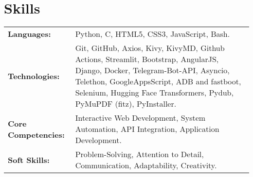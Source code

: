\documentclass[a4paper,10pt]{article}
\begin{document}
\section{Skills}
\begin{tabularx}{\linewidth}{@{} l X @{}}
    \textbf{Languages:} & Python, C, HTML5, CSS3, JavaScript, Bash. \\
    \textbf{Technologies:} & Git, GitHub, Axios, Kivy, KivyMD, Github Actions, Streamlit, Bootstrap, AngularJS, Django, Docker, Telegram-Bot-API, Asyncio, Telethon, GoogleAppsScript, ADB and fastboot, Selenium, Hugging Face Transformers, Pydub, PyMuPDF (fitz), PyInstaller.  \\
    \textbf{Core Competencies:} & Interactive Web Development, System Automation, API Integration, Application Development. \\
    \textbf{Soft Skills:} & Problem-Solving, Attention to Detail, Communication, Adaptability, Creativity. \\
\end{tabularx}

\vspace{11pt}


\newcommand{\projectentry}[5]{%
    \noindent\vspace{1pt}
    \textcolor{myblue}{\textbf{\href{#2}{#1}}} \textcolor{mydarkblue}{\href{#3}{\faLink}} \\ \vspace{-10pt}
    \begin{itemize}[left=0pt, label=--, nosep]
        \item \vspace{-10pt}\textbf{Overview:} #4
    \end{itemize}
    \vspace{-13pt}%
}


\vspace{-13pt}
\end{document}

